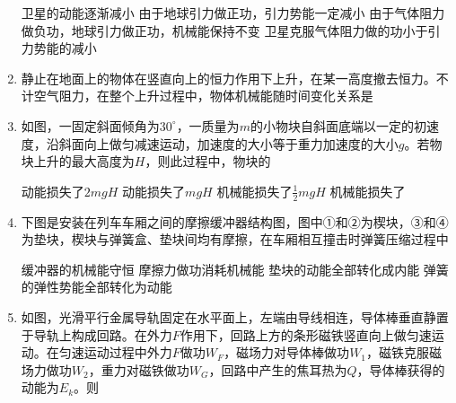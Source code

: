 \begin{enumerate}[leftmargin=0em]
\fourchoices
{卫星的动能逐渐减小}
{由于地球引力做正功，引力势能一定减小}
{由于气体阻力做负功，地球引力做正功，机械能保持不变}
{卫星克服气体阻力做的功小于引力势能的减小}



\item
{}
静止在地面上的物体在竖直向上的恒力作用下上升，在某一高度撤去恒力。不计空气阻力，在整个上升过程中，物体机械能随时间变化关系是  
\begin{figure}[h!]
\centering

\end{figure}




\item 
{}
如图，一固定斜面倾角为$ 30 ^{ \circ } $，一质量为$ m $的小物块自斜面底端以一定的初速度，沿斜面向上做匀减速运动，加速度的大小等于重力加速度的大小$ g $。若物块上升的最大高度为$ H $，则此过程中，物块的  


\begin{minipage}[h!]{0.7\linewidth}
\vspace{0.3em}
\fourchoices
{动能损失了$ 2mgH $}
{动能损失了$ mgH $}
{机械能损失了$ \frac{ 1 }{ 2 } mgH $}
{机械能损失了}
\vspace{0.3em}
\end{minipage}
\hfill
\begin{minipage}[h!]{0.3\linewidth}
\flushright
\vspace{0.3em}

\vspace{0.3em}
\end{minipage}



\item
{}
下图是安装在列车车厢之间的摩擦缓冲器结构图，图中①和②为楔块，③和④为垫块，楔块与弹簧盒、垫块间均有摩擦，在车厢相互撞击时弹簧压缩过程中  
\begin{figure}[h!]
\centering

\end{figure}

\fourchoices
{缓冲器的机械能守恒}
{摩擦力做功消耗机械能}
{垫块的动能全部转化成内能}
{弹簧的弹性势能全部转化为动能}




\item 
{}
如图，光滑平行金属导轨固定在水平面上，左端由导线相连，导体棒垂直静置于导轨上构成回路。在外力$ F $作用下，回路上方的条形磁铁竖直向上做匀速运动。在匀速运动过程中外力$ F $做功$ W_F $，磁场力对导体棒做功$ W_{1} $，磁铁克服磁场力做功$ W_{2} $，重力对磁铁做功$ W_G $，回路中产生的焦耳热为$ Q $，导体棒获得的动能为$ E_{k} $。则  



\end{enumerate}
